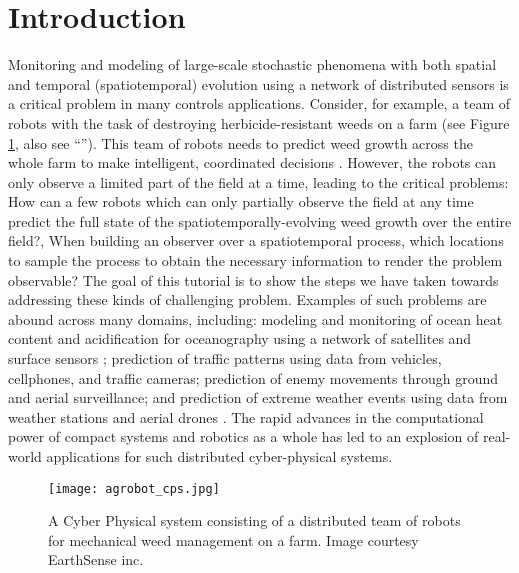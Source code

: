 \section{Introduction} \label{sec:intro}
Monitoring and modeling of large-scale stochastic phenomena with both spatial and temporal (spatiotemporal) evolution using a network of distributed sensors is a critical problem in many controls applications. Consider, for example, a team of robots with the task of destroying herbicide-resistant weeds on a farm (see Figure \ref{fig:cps}, also see ``''). This team of robots needs to predict weed growth across the whole farm  to make intelligent, coordinated decisions \cite{McAllistar18IROS}. However, the robots can only observe a limited part of the field at a time, leading to the critical problems: How can a few robots which can only partially observe the field at any time predict the full state of the spatiotemporally-evolving weed growth over the entire field?, When building an observer over a spatiotemporal process, which locations to sample the process  to obtain the necessary information to render the problem observable? The goal of this tutorial is to show the steps we have taken towards addressing these kinds of challenging problem. Examples of such problems are abound across many domains, including: modeling and monitoring of ocean heat content and acidification for oceanography using a network of satellites and surface sensors \cite{barnett2001detection}; prediction of traffic patterns using data from vehicles, cellphones, and traffic cameras; prediction of enemy movements through ground and aerial surveillance; and prediction of extreme weather events using data from weather stations and aerial drones \cite{heaton2011spatio}. The rapid advances in the computational power of compact systems and robotics as a whole has led to an explosion of real-world applications for such distributed cyber-physical systems. %
 
\begin{figure}[h] %
	\centering
	\texttt{[image: agrobot\_cps.jpg]}
		\caption{A Cyber Physical system consisting of a distributed team of robots for mechanical weed management on a farm. Image courtesy EarthSense inc.}
	\label{fig:cps}
\end{figure}


